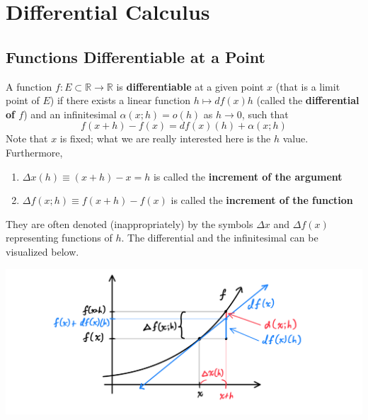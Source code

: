\documentclass{article}
\begin{document}
\section{Differential Calculus}

  \subsection{Functions Differentiable at a Point}

    \begin{definition}
      A function $f: E \subset \mathbb{R} \longrightarrow \mathbb{R}$ is \textbf{differentiable} at a given point $x$ (that is a limit point of $E$) if there exists a linear function $h \mapsto df(x) h$ (called the \textbf{differential of $f$}) and an infinitesimal $\alpha (x;h) = o(h)$ as $h \rightarrow 0$, such that
      \[f(x + h) - f(x) = df(x) (h) + \alpha (x; h)\]
      Note that $x$ is fixed; what we are really interested here is the $h$ value. Furthermore, 
      \begin{enumerate}
        \item $\Delta x(h) \equiv (x + h) - x = h$ is called the \textbf{increment of the argument}
        \item $\Delta f(x;h) \equiv f(x + h) - f(x)$ is called the \textbf{increment of the function} 
      \end{enumerate}
      They are often denoted (inappropriately) by the symbols $\Delta x$ and $\Delta f(x)$ representing functions of $h$. The differential and the infinitesimal can be visualized below. 
      \begin{center}
          \includegraphics[scale=0.25]{img/Differential_Diagram.PNG}
      \end{center}
    \end{definition}
\end{document}
